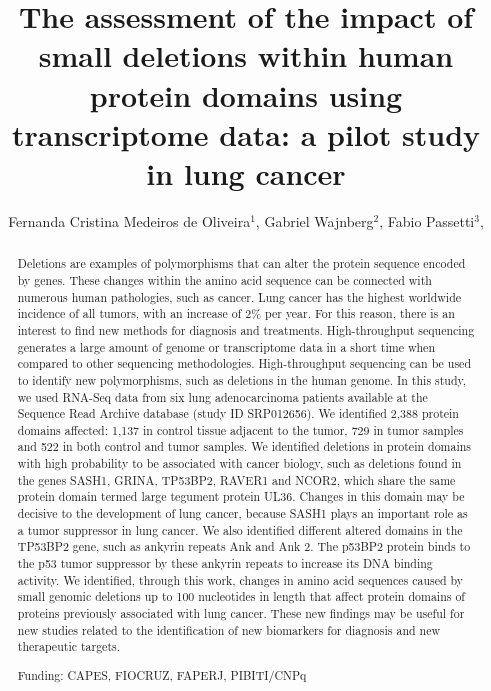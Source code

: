 \documentclass[twoside]{article}
\title{\vspace{-15mm}\fontsize{24pt}{10pt}\selectfont\textbf{ The assessment of the impact of small deletions within human protein domains using transcriptome data: a pilot study in lung cancer }} %
\author{ Fernanda Cristina Medeiros de Oliveira$^{1}$, Gabriel Wajnberg$^{2}$, Fabio Passetti$^{3}$, }
\affil{ 1 FIOCRUZ-IOC

2 Fiocruz-IOC

3 FIOCRUZ - IOC

 }
\date{}
\begin{document}
  
  
  \maketitle %
  
  
  \thispagestyle{fancy} %
  
  
  \begin{abstract}
  Deletions are examples of polymorphisms that can alter the protein sequence encoded by genes. These changes within the amino acid sequence can be connected with numerous human pathologies, such as cancer. Lung cancer has the highest worldwide incidence of all tumors, with an increase of 2\% per year. For this reason, there is an interest to find new methods for diagnosis and treatments. High-throughput sequencing generates a large amount of genome or transcriptome data in a short time when compared to other sequencing methodologies. High-throughput sequencing can be used to identify new polymorphisms, such as deletions in the human genome. In this study, we used RNA-Seq data from six lung adenocarcinoma patients available at the Sequence Read Archive database (study ID SRP012656). We identified 2,388 protein domains affected: 1,137 in control tissue adjacent to the tumor, 729 in tumor samples and 522 in both control and tumor samples. We identified deletions in protein domains with high probability to be associated with cancer biology, such as deletions found in the genes SASH1, GRINA, TP53BP2, RAVER1 and NCOR2, which share the same protein domain termed large tegument protein UL36. Changes in this domain may be decisive to the development of lung cancer, because SASH1 plays an important role as a tumor suppressor in lung cancer. We also identified different altered domains in the TP53BP2 gene, such as ankyrin repeats Ank and Ank 2. The p53BP2 protein binds to the p53 tumor suppressor by these ankyrin repeats to increase its DNA binding activity. We identified, through this work, changes in amino acid sequences caused by small genomic deletions up to 100 nucleotides in length that affect protein domains of proteins previously associated with lung cancer. These new findings may be useful for new studies related to the identification of new biomarkers for diagnosis and new therapeutic targets.
  
  Funding: CAPES, FIOCRUZ, FAPERJ, PIBITI/CNPq \\ 
  \end{abstract}
  
\end{document}

